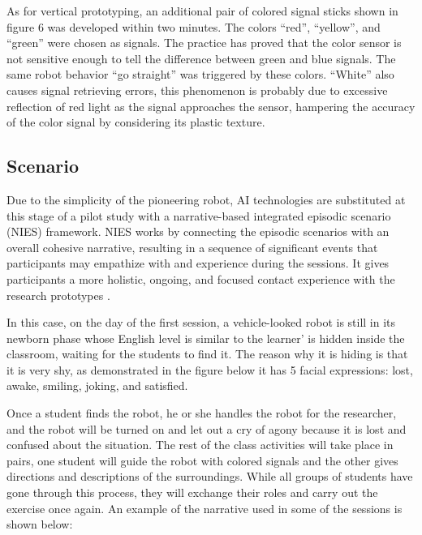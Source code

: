 \documentclass[english]{textolivre}
\begin{document}
As for vertical prototyping, an additional pair of colored signal sticks shown in figure 6 was developed within two minutes. The colors “red”, “yellow”, and “green” were chosen as signals. The practice has proved that the color sensor is not sensitive enough to tell the difference between green and blue signals. The same robot behavior “go straight” was triggered by these colors. “White” also causes signal retrieving errors, this phenomenon is probably due to excessive reflection of red light as the signal approaches the sensor, hampering the accuracy of the color signal by considering its plastic texture.

\subsection{Scenario}\label{sec-organizacao}
Due to the simplicity of the pioneering robot, AI technologies are substituted at this stage of a pilot study with a narrative-based integrated episodic scenario (NIES) framework. NIES works by connecting the episodic scenarios with an overall cohesive narrative, resulting in a sequence of significant events that participants may empathize with and experience during the sessions. It gives participants a more holistic, ongoing, and focused contact experience with the research prototypes \cite{koay_prototyping_2016}.

In this case, on the day of the first session, a vehicle-looked robot is still in its newborn phase whose English level is similar to the learner’ is hidden inside the classroom, waiting for the students to find it. The reason why it is hiding is that it is very shy, as demonstrated in the figure below it has 5 facial expressions: lost, awake, smiling, joking, and satisfied.

Once a student finds the robot, he or she handles the robot for the researcher, and the robot will be turned on and let out a cry of agony because it is lost and confused about the situation. The rest of the class activities will take place in pairs, one student will guide the robot with colored signals and the other gives directions and descriptions of the surroundings. While all groups of students have gone through this process, they will exchange their roles and carry out the exercise once again. An example of the narrative used in some of the sessions is shown below:
\end{document}
